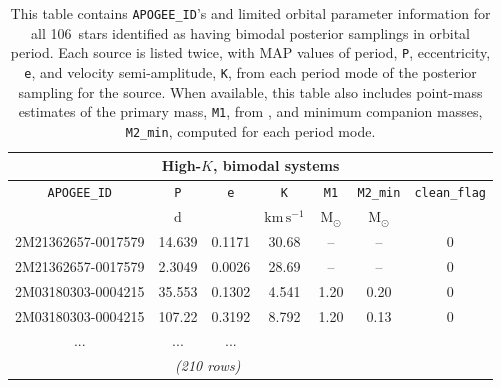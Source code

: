 \documentclass[modern, letterpaper]{aastex62}
\newcommand{\nbimodal}{106}
\begin{document}
\begin{table}[ht]
    \centering
    \begin{tabular}{c | c | c | c | c | c | c}
    \multicolumn{7}{c}{\textbf{High-$K$, bimodal systems}}\\
    \hline
    \texttt{APOGEE\_ID} & \texttt{P} & \texttt{e} & \texttt{K} &
        \texttt{M1} & \texttt{M2\_min} & \texttt{clean\_flag} \\
    & $\mathrm{d}$ & & $\mathrm{km\,s^{-1}}$ &
        $\mathrm{M_{\odot}}$ & $\mathrm{M_{\odot}}$ &  \\
    \hline
    2M21362657-0017579 & 14.639 & 0.1171 & 30.68 & -- & -- & 0 \\
    2M21362657-0017579 & 2.3049 & 0.0026 & 28.69 & -- & -- & 0 \\
    2M03180303-0004215 & 35.553 & 0.1302 & 4.541 & 1.20 & 0.20 & 0 \\
    2M03180303-0004215 & 107.22 & 0.3192 & 8.792 & 1.20 & 0.13 & 0 \\
    ... & ... & ... \\
    \hline
    \multicolumn{6}{c}{\textit{(210 rows)}}
    \end{tabular}
    \caption{This table contains \texttt{APOGEE\_ID}'s and limited orbital
    parameter information for all \nbimodal\ stars identified as having bimodal
    posterior samplings in orbital period.
    Each source is listed twice, with MAP values of period, \texttt{P},
    eccentricity, \texttt{e}, and velocity semi-amplitude, \texttt{K}, from each
    period mode of the posterior sampling for the source.
    When available, this table also includes point-mass estimates of the primary
    mass, \texttt{M1}, from \citet{Ness:2015}, and minimum companion masses,
    \texttt{M2\_min}, computed for each period mode.
    }
    \label{tbl:highK-bimodal}
\end{table}

\clearpage
\end{document}
